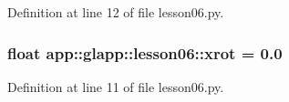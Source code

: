 Definition at line 12 of file lesson06.py.
\subsubsection{\setlength{\rightskip}{0pt plus 5cm}float {\bf app::glapp::lesson06::xrot} = 0.0\hspace{0.3cm}{\tt  [static]}}\label{namespaceapp_1_1glapp_1_1lesson06_e7e48c3c50a204ad3dbead740d2da3a2}




Definition at line 11 of file lesson06.py.
